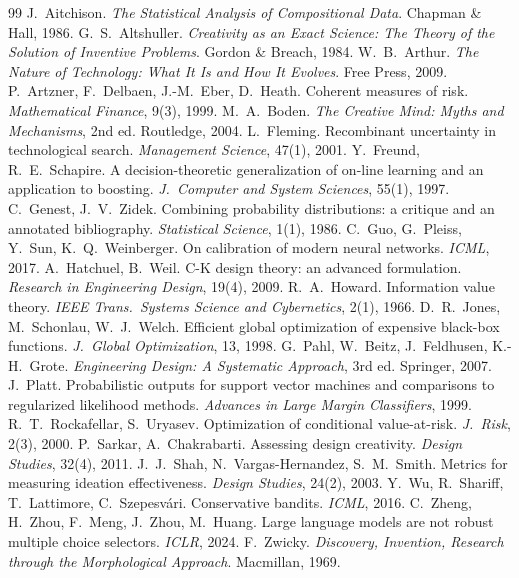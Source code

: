 \documentclass[11pt]{article}
\theoremstyle{definition}
\begin{document}
\begin{thebibliography}{99}\small
{} J.~Aitchison. \emph{The Statistical Analysis of Compositional Data}.
Chapman \& Hall, 1986.
 G.~S.~Altshuller. \emph{Creativity as an Exact Science: The Theory of the
Solution of Inventive Problems}. Gordon \& Breach, 1984.
 W.~B.~Arthur. \emph{The Nature of Technology: What It Is and How It Evolves}.
Free Press, 2009.
 P.~Artzner, F.~Delbaen, J.-M.~Eber, D.~Heath. Coherent measures of risk.
\emph{Mathematical Finance}, 9(3), 1999.
 M.~A.~Boden. \emph{The Creative Mind: Myths and Mechanisms}, 2nd ed.
Routledge, 2004.
 L.~Fleming. Recombinant uncertainty in technological search.
\emph{Management Science}, 47(1), 2001.
 Y.~Freund, R.~E.~Schapire. A decision-theoretic generalization of on-line
learning and an application to boosting. \emph{J.\ Computer and System Sciences}, 55(1), 1997.
 C.~Genest, J.~V.~Zidek. Combining probability distributions: a critique and an
annotated bibliography. \emph{Statistical Science}, 1(1), 1986.
 C.~Guo, G.~Pleiss, Y.~Sun, K.~Q.~Weinberger. On calibration of modern neural
networks. \emph{ICML}, 2017.
 A.~Hatchuel, B.~Weil. C-K design theory: an advanced formulation.
\emph{Research in Engineering Design}, 19(4), 2009.
 R.~A.~Howard. Information value theory. \emph{IEEE Trans.\ Systems Science and
Cybernetics}, 2(1), 1966.
 D.~R.~Jones, M.~Schonlau, W.~J.~Welch. Efficient global optimization of
expensive black-box functions. \emph{J.\ Global Optimization}, 13, 1998.
 G.~Pahl, W.~Beitz, J.~Feldhusen, K.-H.~Grote. \emph{Engineering Design: A
Systematic Approach}, 3rd ed. Springer, 2007.
 J.~Platt. Probabilistic outputs for support vector machines and comparisons to
regularized likelihood methods. \emph{Advances in Large Margin Classifiers}, 1999.
 R.~T.~Rockafellar, S.~Uryasev. Optimization of conditional
value-at-risk. \emph{J.\ Risk}, 2(3), 2000.
 P.~Sarkar, A.~Chakrabarti. Assessing design creativity. \emph{Design
Studies}, 32(4), 2011.
 J.~J.~Shah, N.~Vargas-Hernandez, S.~M.~Smith. Metrics for measuring ideation
effectiveness. \emph{Design Studies}, 24(2), 2003.
 Y.~Wu, R.~Shariff, T.~Lattimore, C.~Szepesv\'ari. Conservative bandits.
\emph{ICML}, 2016.
 C.~Zheng, H.~Zhou, F.~Meng, J.~Zhou, M.~Huang. Large language models are not
robust multiple choice selectors. \emph{ICLR}, 2024.
 F.~Zwicky. \emph{Discovery, Invention, Research through the Morphological
Approach}. Macmillan, 1969.
\end{thebibliography}
\end{document}
